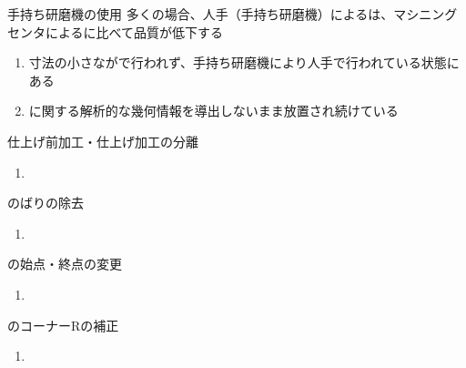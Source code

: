 \clearpage
\begin{Issues}{手持ち研磨機の使用}
多くの場合、人手（手持ち研磨機）による\EndFaceChamferMilling は、マシニングセンタによる\EndFaceChamferMilling に比べて品質が低下する
\begin{enumerate}[label=\sarrow]
\item[{\sarrow[red]}]
寸法の小さな\EndFaceCChamferMilling が\MMC で行われず、手持ち研磨機により人手で行われている状態にある
\item[{\sarrow[red]}] \EndFaceChamferMilling に関する解析的な幾何情報を導出しないまま放置され続けている
\end{enumerate}
\end{Issues}

\begin{Issues}{仕上げ前加工・仕上げ加工の分離\TBW}
\begin{enumerate}[label=\sarrow]
\item[{\sarrow[red]}]
\end{enumerate}
\end{Issues}

\begin{Issues}{\KeywayMilling のばりの除去\TBW}
\begin{enumerate}[label=\sarrow]
\item[{\sarrow[red]}]
\end{enumerate}
\end{Issues}

\begin{Issues}{\EndFaceInCChamferMilling の始点・終点の変更\TBW}
\begin{enumerate}[label=\sarrow]
\item[{\sarrow[red]}]
\end{enumerate}
\end{Issues}

\begin{Issues}{\EndFaceInCChamferMilling のコーナーRの補正\TBW}
\begin{enumerate}[label=\sarrow]
\item[{\sarrow[red]}]
\end{enumerate}
\end{Issues}


